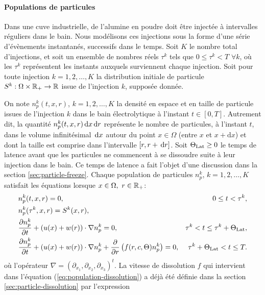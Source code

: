\paragraph{Populations de particules}
Dans une cuve industrielle, de l'alumine en poudre doit être injectée
à intervalles réguliers dans le bain. Nous modélisons ces injections
sous la forme d'une série d'évènements instantanés, successifs dans le
temps. Soit $K$ le nombre total d'injections, et soit un ensemble de
nombres réels $\tau^k$ tels que $0\leq \tau^k < T$ $\forall k$, où
les $\tau^k$ représentent les
instants auxquels surviennent chaque injection. Soit pour toute
injection $k = 1,2, \dots, K$ la distribution initiale de particule
$S^k:\Omega\times\mathbb R_+\to\mathbb R$ issue de l'injection $k$,
supposée donnée.

On note $n_p^k(t, x, r)$, $k = 1, 2, \dots, K$ la densité en espace et
en taille de particule issues de l'injection $k$ dans le bain
électrolytique à l'instant $t \in [0, T]$. Autrement dit, la quantité
$n_p^k(t, x, r)\,\mathrm dx\,\mathrm dr$ représente le nombre de particules, à
l'instant $t$, dans le volume infinitésimal $\,\mathrm dx$ autour du point
$x\in\Omega$ (entre $x$ et $x + \mathrm dx$) et dont la taille est comprise dans l'intervalle $[r,
  r+\,\mathrm dr]$. Soit $\Theta_\text{Lat} \geq 0$ le temps de latence avant que les
particules ne commencent à se dissoudre suite à leur injection dans le
bain. Ce temps de latence a fait l'objet d'une discussion dans la
section \ref{sec:particle-freeze}. Chaque population de particules
$n_p^k$, $k = 1, 2,\dots, K$ satisfait les
équations lorsque $x\in\Omega,\ r\in\rplus$:
\begin{align}
  &n_p^k(t, x, r) = 0, & 0\leq t < \tau^k,\label{eq:population-pre-injection}\\
  &n_p^k(\tau^k, x, r) = S^k(x, r),\label{eq:population-injection}\\
  &\frac{\partial n_p^k}{\partial t} + (u(x) + w(r))\cdot \nabla n_p^k
  = 0, &\tau^k < t \leq \tau^k +
  \Theta_\text{Lat},\label{eq:population-transport}\\
  &\frac{\partial n_p^k}{\partial t} + (u(x) + w(r))\cdot \nabla n_p^k
  + \frac{\partial}{\partial r} \left( f(r, c,
    \Theta) n_p^k \right) = 0, &\tau^k + \Theta_\text{Lat} < t \leq T.\label{eq:population-dissolution}
\end{align}
où l'opérateur $\nabla = (\partial_{x_1}, \partial_{x_2},
\partial_{x_3})^t$. La vitesse de dissolution $f$ qui intervient dans
l'équation (\ref{eq:population-dissolution}) a déjà été définie dans
la section \ref{sec:particle-dissolution} par l'expression
